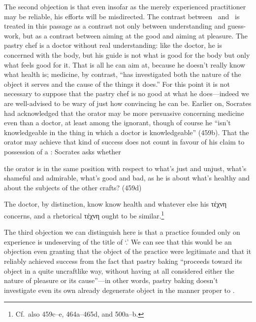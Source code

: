 \documentclass[11pt,letterpaper,oneside]{amsart} %
\begin{document}


The second objection is that even insofar as the merely experienced practitioner may be reliable, his efforts will be misdirected. The contrast between \techne\ and \empeiria\ is treated in this passage as a contrast not only between understanding and guess-work, but as a contrast between aiming at the good and aiming at pleasure. The pastry chef is a doctor without real understanding: like the doctor, he is concerned with the body, but his guide is not what is good for the body but only what feels good for it. That is all he can aim at, because he doesn't really know what health is; medicine, by contrast, ``has investigated both the nature of the object it serves and the cause of the things it does.'' For this point it is not necessary to suppose that the pastry chef is no good at what he does---indeed we are well-advised to be wary of just how convincing he can be. Earlier on, Socrates had acknowledged that the orator may be more persuasive concerning medicine even than a doctor, at least among the ignorant, though of course he ``isn't knowledgeable in the thing in which a doctor is knowledgeable'' (459b). That the orator may achieve that kind of success does not count in favour of his claim to possession of a \techne: Socrates asks whether\begin{squote}the orator is in the same position with respect to what's just and unjust, what's shameful and admirable, what's good and bad, as he is about what's healthy and about the subjects of the other crafts? (459d)\end{squote} The doctor, by distinction,  know know health and whatever else his τέχνη concerns, and a rhetorical τέχνη ought to be similar.\footnote{Cf.\ also 459c--e, 464a--465d, and 500a--b.}





The third objection we can distinguish here is that a practice founded only on experience is undeserving of the title of `\techne.' We can see that this would be an objection even granting that the object of the practice were legitimate and that it reliably achieved success from the fact that pastry baking ``proceeds toward its object in a quite uncraftlike way, without having at all considered either the nature of pleasure or its cause''---in other words, pastry baking doesn't investigate even its own already degenerate object in the manner proper to \techne.%
\end{document}
